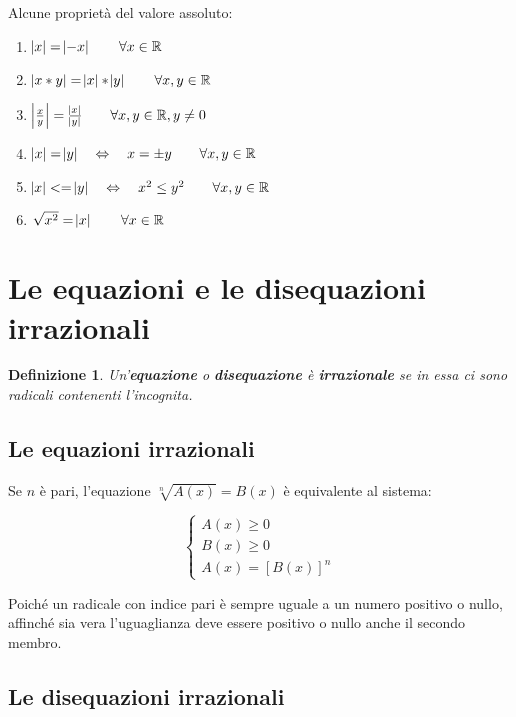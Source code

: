 \documentclass[12pt, letterpaper]{article}
\newtheorem{definition}{Definizione}[section]
\begin{document}
	Alcune proprietà del valore assoluto:
	
	\begin{enumerate}
		\item $\abs{x} = \abs{-x} \qquad \forall x \in \mathbb{R}$
		\item $\abs{x * y}=\abs{x} * \abs{y} \qquad \forall x, y \in \mathbb{R}$
		\item $\abs{\frac{x}{y}} = \frac{\abs{x}}{\abs{y}} \qquad \forall x, y \in\mathbb{R}, y \neq 0$
		\item $\abs{x} = \abs{y} \quad \Leftrightarrow \quad x = \pm{y} \qquad \forall x, y \in \mathbb{R}$
		\item $\abs{x} <= \abs{y} \quad \Leftrightarrow \quad x^2 \leq y^2 \qquad \forall x, y \in \mathbb{R}$
		\item $\sqrt{x^2} = \abs{x} \qquad \forall x \in \mathbb{R}$
	\end{enumerate}
		
	\section{Le equazioni e le disequazioni irrazionali}
	
	\begin{definition}
		Un'\textbf{equazione} o \textbf{disequazione} è \textbf{irrazionale} se in essa ci sono radicali contenenti l'incognita.
	\end{definition}

	\subsection{Le equazioni irrazionali}
	
	Se $n$ è pari, l'equazione $\sqrt[n]{A(x)} = B(x)$ è equivalente al sistema:
	
	\[
	\begin{cases}
		
		A(x) \geq 0 \\
		B(x) \geq 0 \\
		A(x) = [B(x)]^n
		
	\end{cases}
	\]
	
	Poiché un radicale con indice pari è sempre uguale a un numero positivo o nullo, affinché sia vera l'uguaglianza deve essere positivo o nullo anche il secondo membro.
	
	\subsection{Le disequazioni irrazionali}
	
\end{document}
